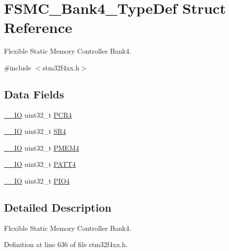 \hypertarget{struct_f_s_m_c___bank4___type_def}{}\section{F\+S\+M\+C\+\_\+\+Bank4\+\_\+\+Type\+Def Struct Reference}
\label{struct_f_s_m_c___bank4___type_def}


Flexible Static Memory Controller Bank4.  




{\ttfamily \#include $<$stm32f4xx.\+h$>$}

\subsection*{Data Fields}
\begin{DoxyCompactItemize}
\item 
\hyperlink{group___c_m_s_i_s__core__definitions_gaec43007d9998a0a0e01faede4133d6be}{\+\_\+\+\_\+\+IO} uint32\+\_\+t \hyperlink{struct_f_s_m_c___bank4___type_def_a2f02e7acfbd7e549ede84633215eb6a1}{P\+C\+R4}
\item 
\hyperlink{group___c_m_s_i_s__core__definitions_gaec43007d9998a0a0e01faede4133d6be}{\+\_\+\+\_\+\+IO} uint32\+\_\+t \hyperlink{struct_f_s_m_c___bank4___type_def_a8218d6e11dae5d4468c69303dec0b4fc}{S\+R4}
\item 
\hyperlink{group___c_m_s_i_s__core__definitions_gaec43007d9998a0a0e01faede4133d6be}{\+\_\+\+\_\+\+IO} uint32\+\_\+t \hyperlink{struct_f_s_m_c___bank4___type_def_a3f82cc749845fb0dd7dfa8121d96b663}{P\+M\+E\+M4}
\item 
\hyperlink{group___c_m_s_i_s__core__definitions_gaec43007d9998a0a0e01faede4133d6be}{\+\_\+\+\_\+\+IO} uint32\+\_\+t \hyperlink{struct_f_s_m_c___bank4___type_def_a955cad1aab7fb2d5b6e216cb29b5e7e2}{P\+A\+T\+T4}
\item 
\hyperlink{group___c_m_s_i_s__core__definitions_gaec43007d9998a0a0e01faede4133d6be}{\+\_\+\+\_\+\+IO} uint32\+\_\+t \hyperlink{struct_f_s_m_c___bank4___type_def_ac53cd7a08093a4ae8f4de4bcff67a64f}{P\+I\+O4}
\end{DoxyCompactItemize}


\subsection{Detailed Description}
Flexible Static Memory Controller Bank4. 

Definition at line 636 of file stm32f4xx.\+h.



